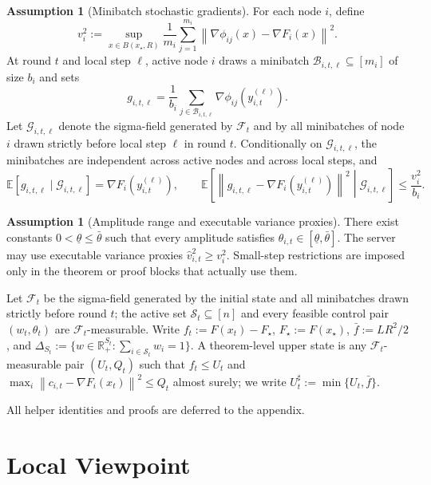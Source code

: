 \documentclass{article}
\theoremstyle{definition}
\newtheorem{assumption}[theorem]{Assumption}
\newcommand{\RR}{\mathbb R}
\newcommand{\EE}{\mathbb E}
\newcommand{\cF}{\mathcal F}
\newcommand{\cG}{\mathcal G}
\newcommand{\norm}[1]{\left\lVert #1\right\rVert}
\begin{document}
\begin{assumption}[Minibatch stochastic gradients]
For each node $i$, define
\[
v_i^2:=\sup_{x\in B(x_\star,R)}\frac1{m_i}\sum_{j=1}^{m_i}\norm{\nabla \phi_{ij}(x)-\nabla F_i(x)}^2.
\]
At round $t$ and local step $\ell$, active node $i$ draws a minibatch $\mathcal B_{i,t,\ell}\subseteq[m_i]$ of size $b_i$ and sets
\[
g_{i,t,\ell}=\frac1{b_i}\sum_{j\in\mathcal B_{i,t,\ell}}\nabla \phi_{ij}(y_{i,t}^{(\ell)}).
\]
Let $\cG_{i,t,\ell}$ denote the sigma-field generated by $\cF_t$ and by all minibatches of node $i$ drawn strictly before local step $\ell$ in round $t$. Conditionally on $\cG_{i,t,\ell}$, the minibatches are independent across active nodes and across local steps, and
\[
\EE[g_{i,t,\ell}\mid \cG_{i,t,\ell}]=\nabla F_i(y_{i,t}^{(\ell)}),\qquad \EE\!\left[\norm{g_{i,t,\ell}-\nabla F_i(y_{i,t}^{(\ell)})}^2\middle|\cG_{i,t,\ell}\right]\le \frac{v_i^2}{b_i}.
\]
\end{assumption}

\begin{assumption}[Amplitude range and executable variance proxies]
There exist constants $0<\underline\theta\le \bar\theta$ such that every amplitude satisfies $\theta_{i,t}\in[\underline\theta,\bar\theta]$. The server may use executable variance proxies $\widehat v_{i,t}^2\ge v_i^2$. Small-step restrictions are imposed only in the theorem or proof blocks that actually use them.
\end{assumption}

Let $\cF_t$ be the sigma-field generated by the initial state and all minibatches drawn strictly before round $t$; the active set $\mathcal S_t\subseteq[n]$ and every feasible control pair $(w_t,\theta_t)$ are $\cF_t$-measurable. Write $f_t:=F(x_t)-F_\star$, $F_\star:=F(x_\star)$, $\bar f:=LR^2/2$, and $\Delta_{S_t}:=\{w\in\RR_+^{S_t}:\sum_{i\in\mathcal S_t}w_i=1\}$. A theorem-level upper state is any $\cF_t$-measurable pair $(U_t,Q_t)$ such that $f_t\le U_t$ and $\max_i\norm{c_{i,t}-\nabla F_i(x_t)}^2\le Q_t$ almost surely; we write $U_t^\sharp:=\min\{U_t,\bar f\}$.

All helper identities and proofs are deferred to the appendix.

\section{Local Viewpoint}
\end{document}
